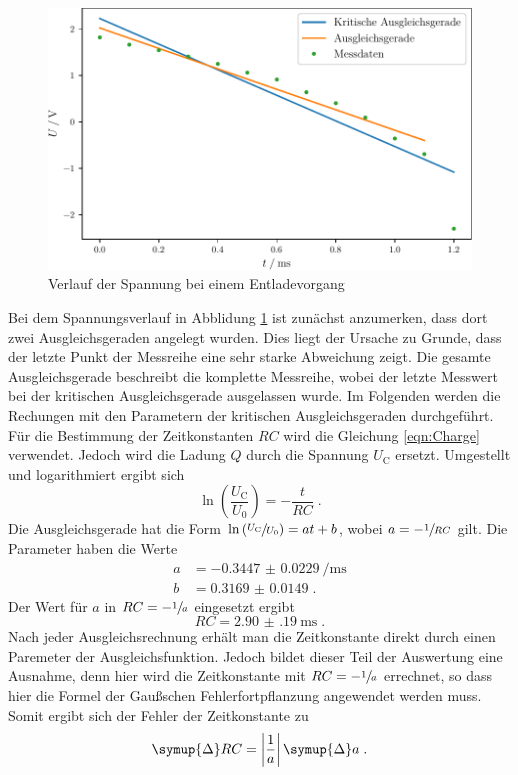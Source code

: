 \begin{figure}
        \centering
        \caption{Verlauf der Spannung bei einem Entladevorgang}
        \label{fig:discharge}
        \includegraphics{build/uct.pdf}
\end{figure}
Bei dem Spannungsverlauf in Abblidung \ref{fig:discharge} ist zunächst anzumerken, dass dort zwei Ausgleichsgeraden angelegt wurden. 
Dies liegt der Ursache zu Grunde, dass der letzte Punkt der Messreihe eine sehr starke Abweichung zeigt.
Die gesamte Ausgleichsgerade beschreibt die komplette Messreihe, wobei der letzte Messwert bei der kritischen Ausgleichsgerade ausgelassen wurde.
Im Folgenden werden die Rechungen mit den Parametern der kritischen Ausgleichsgeraden durchgeführt.
Für die Bestimmung der Zeitkonstanten $RC$ wird die Gleichung \eqref{eqn:Charge} verwendet.
Jedoch wird die Ladung $Q$ durch die Spannung $U_\text{C}$ ersetzt.
Umgestellt und logarithmiert ergibt sich 
\begin{equation}
    \ln \left( \frac{U_\text{C}}{U_0} \right ) =  - \frac{t}{RC} \; \text{.} 
\end{equation} 
Die Ausgleichsgerade hat die Form $ \ln \left( \sfrac{U_\text{C}}{U_0} \right ) = at + b$, wobei $a = - \sfrac{1}{RC}$ gilt.
Die Parameter haben die Werte 
\begin{align*}
    a &= \SI{-0.3447(229)}{\per\milli\second} \\
    b &= \num{0.3169(149)} \; \text{.}
\end{align*}
Der Wert für $a$ in $RC = - \sfrac{1}{a}$ eingesetzt ergibt
\begin{equation*}
   RC = \SI{2.90(19)}{\milli\second} \; \text{.}
\end{equation*}
Nach jeder Ausgleichsrechnung erhält man die Zeitkonstante direkt durch einen Paremeter der Ausgleichsfunktion.
Jedoch bildet dieser Teil der Auswertung eine Ausnahme, denn hier wird die Zeitkonstante mit $RC = - \sfrac{1}{a}$ errechnet, so dass hier die Formel der Gaußschen
Fehlerfortpflanzung angewendet werden muss.
Somit ergibt sich der Fehler der Zeitkonstante zu 
\begin{equation}
    \symup{\Delta} RC = \abs*{\frac{1}{a}} \, \symup{\Delta} a \; \text{.}
\end{equation}
